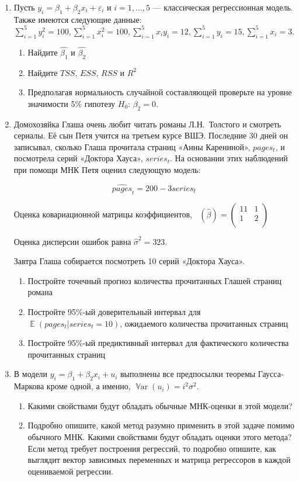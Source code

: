 \documentclass[12pt,a4paper]{article}
\DeclareMathOperator{\E}{\mathbb{E}}
\DeclareMathOperator{\Var}{\mathbb{V}ar}
\DeclareMathOperator{\hVar}{\widehat{\mathbb{V}ar}}
\newcommand{\hb}{\hat\beta}
\newcommand{\hs}{\hat\sigma}
\begin{document}
\begin{enumerate}
\item Пусть $y_i = \beta_1 + \beta_2 x_i + \varepsilon_i$ и $i = 1, \dots, 5$ — классическая регрессионная модель. Также имеются следующие данные: $\sum_{i=1}^5 y_i^2 = 100, \sum_{i=1}^5 x_i^2 = 100, \sum_{i=1}^5 x_iy_i = 12, \sum_{i=1}^5 y_i = 15, \sum_{i=1}^5 x_i = 3.$

\begin{enumerate}
\item Найдите $\hat{\beta_1}$ и $\hat{\beta_2}$
\item Найдите $TSS$, $ESS$, $RSS$ и $R^2$
\item Предполагая нормальность случайной составляющей проверьте на уровне значимости 5\% гипотезу $H_0$: $\beta_2 = 0$.
\end{enumerate}


\item Домохозяйка Глаша очень любит читать романы Л.Н.~Толстого и смотреть сериалы. Её сын Петя учится на третьем курсе ВШЭ.  Последние 30 дней он записывал, сколько Глаша прочитала страниц «Анны Карениной», $pages_t$, и посмотрела серий «Доктора Хауса», $series_t$. На основании этих наблюдений при помощи МНК Петя оценил следующую модель:

\[
\widehat{pages}_t=200-3series_t
\]

Оценка ковариационной матрицы коэффициентов,
$\hVar(\hb) = \begin{pmatrix}
11 & 1 \\
1 & 2 \\
\end{pmatrix}$

Оценка дисперсии ошибок равна $\hs^2=323$.

Завтра Глаша собирается посмотреть 10 серий «Доктора Хауса».

\begin{enumerate}
\item Постройте точечный прогноз количества прочитанных Глашей страниц романа
\item Постройте 95\%-ый доверительный интервал для $\E(pages_t |series_t=10)$, ожидаемого количества прочитанных страниц
\item	Постройте 95\%-ый предиктивный интервал для фактического количества прочитанных страниц
\end{enumerate}


\item В модели $y_i = \beta_1 + \beta_2 x_i + u_i$ выполнены все предпосылки теоремы Гаусса-Маркова кроме одной, а именно, $\Var(u_i) = i^2 \sigma^2$.
\begin{enumerate}
  \item Какими свойствами будут обладать обычные МНК-оценки в этой модели?
  \item Подробно опишите, какой метод разумно применить в этой задаче помимо обычного МНК. Какими свойствами будут обладать оценки этого метода? Если метод требует построения регрессий, то подробно опишите, как выглядит вектор зависимых переменных и матрица регрессоров в каждой оцениваемой регрессии.
\end{enumerate}




\end{enumerate}
\end{document}
